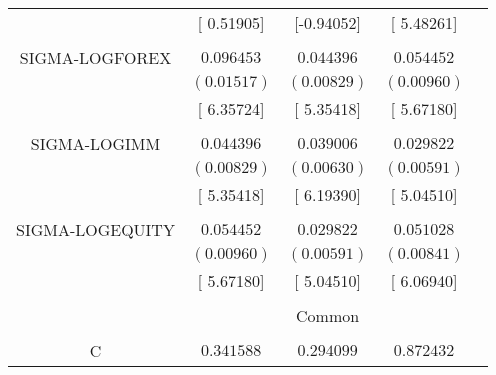 \begin{tabular}{lrrrr}
\multicolumn{1}{c}{}&\multicolumn{1}{c}{[ 0.51905]}&\multicolumn{1}{c}{[-0.94052]}&\multicolumn{1}{c}{[ 5.48261]}&\multicolumn{1}{c}{}\\
\multicolumn{1}{c}{}&\multicolumn{1}{c}{}&\multicolumn{1}{c}{}&\multicolumn{1}{c}{}&\multicolumn{1}{c}{}\\
\multicolumn{1}{c}{SIGMA-LOGFOREX}&\multicolumn{1}{c}{$0.096453$}&\multicolumn{1}{c}{$0.044396$}&\multicolumn{1}{c}{$0.054452$}&\multicolumn{1}{c}{}\\
\multicolumn{1}{c}{}&\multicolumn{1}{c}{$(0.01517)$}&\multicolumn{1}{c}{$(0.00829)$}&\multicolumn{1}{c}{$(0.00960)$}&\multicolumn{1}{c}{}\\
\multicolumn{1}{c}{}&\multicolumn{1}{c}{[ 6.35724]}&\multicolumn{1}{c}{[ 5.35418]}&\multicolumn{1}{c}{[ 5.67180]}&\multicolumn{1}{c}{}\\
\multicolumn{1}{c}{}&\multicolumn{1}{c}{}&\multicolumn{1}{c}{}&\multicolumn{1}{c}{}&\multicolumn{1}{c}{}\\
\multicolumn{1}{c}{SIGMA-LOGIMM}&\multicolumn{1}{c}{$0.044396$}&\multicolumn{1}{c}{$0.039006$}&\multicolumn{1}{c}{$0.029822$}&\multicolumn{1}{c}{}\\
\multicolumn{1}{c}{}&\multicolumn{1}{c}{$(0.00829)$}&\multicolumn{1}{c}{$(0.00630)$}&\multicolumn{1}{c}{$(0.00591)$}&\multicolumn{1}{c}{}\\
\multicolumn{1}{c}{}&\multicolumn{1}{c}{[ 5.35418]}&\multicolumn{1}{c}{[ 6.19390]}&\multicolumn{1}{c}{[ 5.04510]}&\multicolumn{1}{c}{}\\
\multicolumn{1}{c}{}&\multicolumn{1}{c}{}&\multicolumn{1}{c}{}&\multicolumn{1}{c}{}&\multicolumn{1}{c}{}\\
\multicolumn{1}{c}{SIGMA-LOGEQUITY}&\multicolumn{1}{c}{$0.054452$}&\multicolumn{1}{c}{$0.029822$}&\multicolumn{1}{c}{$0.051028$}&\multicolumn{1}{c}{}\\
\multicolumn{1}{c}{}&\multicolumn{1}{c}{$(0.00960)$}&\multicolumn{1}{c}{$(0.00591)$}&\multicolumn{1}{c}{$(0.00841)$}&\multicolumn{1}{c}{}\\
\multicolumn{1}{c}{}&\multicolumn{1}{c}{[ 5.67180]}&\multicolumn{1}{c}{[ 5.04510]}&\multicolumn{1}{c}{[ 6.06940]}&\multicolumn{1}{c}{}\\
[4.5pt] \hline \\ [-4.5pt]
\multicolumn{1}{c}{}&\multicolumn{3}{c}{Common}&\multicolumn{1}{c}{}\\
[4.5pt] \hline \\ [-4.5pt]
\multicolumn{1}{c}{C}&\multicolumn{1}{c}{$0.341588$}&\multicolumn{1}{c}{$0.294099$}&\multicolumn{1}{c}{$0.872432$}&\multicolumn{1}{c}{}\\

\end{tabular}
